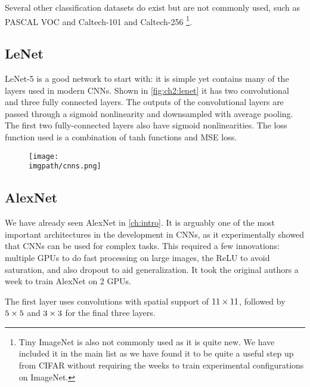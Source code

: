 Several other classification datasets do exist but are not commonly used, such
as PASCAL VOC \cite{Everingham15} and Caltech-101 and Caltech-256
\cite{li_fei-fei_learning_2004}\footnote{Tiny ImageNet is also not commonly
used as it is quite new. We have included it in the main list as we have found it
to be quite a useful step up from CIFAR without requiring the weeks to train
experimental configurations on ImageNet.}.

\subsection{LeNet}
LeNet-5 \cite{lecun_gradient-based_1998} is a good network to start with: it
is simple yet contains many of the layers used in modern CNNs. Shown in
\autoref{fig:ch2:lenet} it has two convolutional and three fully connected
layers. The outputs of the convolutional layers are passed through a sigmoid
nonlinearity and downsampled with average pooling. The first two fully-connected
layers also have sigmoid nonlinearities. The loss function used is a combination
of tanh functions and MSE loss.

\begin{figure}
  \centering
  \texttt{[image: \\imgpath/cnns.png]}
  \label{fig:ch2:lenet}
\end{figure}

\subsection{AlexNet}
We have already seen AlexNet \cite{krizhevsky_imagenet_2012} in \autoref{ch:intro}.
It is arguably one of the most important architectures in the development in CNNs, as it
experimentally showed that CNNs can be used for complex tasks. This
required a few innovations: multiple GPUs to do fast
processing on large images, the ReLU to avoid saturation, and also dropout
to aid generalization. It took the original authors a week to train AlexNet on 2
GPUs.

The first layer uses convolutions with spatial support of $11\times11$, followed
by $5\times 5$ and $3\times 3$ for the final three layers.

